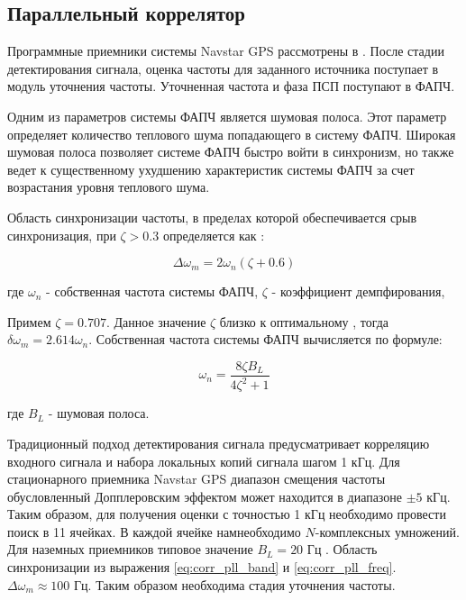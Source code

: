 \subsection{Параллельный коррелятор}

Программные приемники системы Navstar GPS рассмотрены в \cite{tsui, akos-book}.
После стадии детектирования сигнала, оценка частоты для заданного источника поступает в модуль уточнения частоты.
Уточненная частота и фаза ПСП поступают в ФАПЧ.

Одним из параметров системы ФАПЧ является шумовая полоса.
Этот параметр определяет количество теплового шума попадающего в систему ФАПЧ. Широкая шумовая полоса позволяет системе ФАПЧ быстро войти в синхронизм,
но также ведет к существенному ухудшению характеристик системы ФАПЧ за счет возрастания уровня теплового шума.

Область синхронизации частоты, в пределах которой обеспечивается срыв синхронизация, при ${\zeta>0.3}$ определяется как \cite{spilker-book}:

\begin{center}
\begin{equation}
	\label{eq:corr_pll_band}
	\Delta \omega_m = 2 \omega_n (\zeta + 0.6)
\end{equation}
\end{center}
где ${\omega_n}$ - собственная частота системы ФАПЧ, ${\zeta}$ - коэффициент демпфирования,

Примем ${\zeta=0.707}$. Данное значение ${\zeta}$ близко к оптимальному \cite{tsui, spilker-book}, тогда ${\delta \omega_m = 2.614 \omega_n}$.
Собственная частота системы ФАПЧ вычисляется по формуле:

\begin{center}
\begin{equation}
	\label{eq:corr_pll_freq}
	\omega_n = \frac{8 \zeta B_L}{4 \zeta^2 + 1} 
\end{equation}
\end{center}
где ${B_L}$ - шумовая полоса.

Традиционный подход детектирования сигнала предусматривает корреляцию входного сигнала и набора локальных копий сигнала шагом 1 кГц.
Для стационарного приемника Navstar GPS диапазон смещения частоты обусловленный Допплеровским эффектом \cite{tsui} может находится в диапазоне ${\pm 5}$ кГц.
Таким образом, для получения оценки с точностью 1 кГц необходимо провести поиск в 11 ячейках. В каждой ячейке намнеобходимо ${N}$-комплексных умножений.
Для наземных приемников типовое значение  ${B_L=20}$ Гц \cite{tsui, akos-book}. Область синхронизации из выражения \ref{eq:corr_pll_band} и  \ref{eq:corr_pll_freq}.
${\Delta \omega_m \approx 100}$ Гц. Таким образом необходима стадия уточнения частоты.

